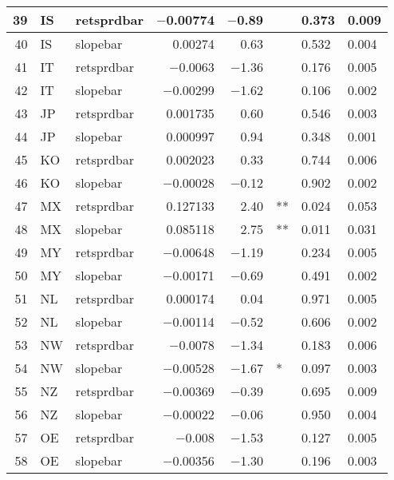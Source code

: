 \begin{longtable}{|r|l|l|r|r|l|l|l|}
   39 &    IS &    retsprdbar &    $-$0.00774 &    $-$0.89 &      &    0.373 &    0.009\\\hline
   40 &    IS &    slopebar &    0.00274 &    0.63 &      &    0.532 &    0.004\\\hline
   41 &    IT &    retsprdbar &    $-$0.0063 &    $-$1.36 &      &    0.176 &    0.005\\\hline
   42 &    IT &    slopebar &    $-$0.00299 &    $-$1.62 &      &    0.106 &    0.002\\\hline
   43 &    JP &    retsprdbar &    0.001735 &    0.60 &      &    0.546 &    0.003\\\hline
   44 &    JP &    slopebar &    0.000997 &    0.94 &      &    0.348 &    0.001\\\hline
   45 &    KO &    retsprdbar &    0.002023 &    0.33 &      &    0.744 &    0.006\\\hline
   46 &    KO &    slopebar &    $-$0.00028 &    $-$0.12 &      &    0.902 &    0.002\\\hline
   47 &    MX &    retsprdbar &    0.127133 &    2.40 &    ** &    0.024 &    0.053\\\hline
   48 &    MX &    slopebar &    0.085118 &    2.75 &    ** &    0.011 &    0.031\\\hline
   49 &    MY &    retsprdbar &    $-$0.00648 &    $-$1.19 &      &    0.234 &    0.005\\\hline
   50 &    MY &    slopebar &    $-$0.00171 &    $-$0.69 &      &    0.491 &    0.002\\\hline
   51 &    NL &    retsprdbar &    0.000174 &    0.04 &      &    0.971 &    0.005\\\hline
   52 &    NL &    slopebar &    $-$0.00114 &    $-$0.52 &      &    0.606 &    0.002\\\hline
   53 &    NW &    retsprdbar &    $-$0.0078 &    $-$1.34 &      &    0.183 &    0.006\\\hline
   54 &    NW &    slopebar &    $-$0.00528 &    $-$1.67 &    * &    0.097 &    0.003\\\hline
   55 &    NZ &    retsprdbar &    $-$0.00369 &    $-$0.39 &      &    0.695 &    0.009\\\hline
   56 &    NZ &    slopebar &    $-$0.00022 &    $-$0.06 &      &    0.950 &    0.004\\\hline
   57 &    OE &    retsprdbar &    $-$0.008 &    $-$1.53 &      &    0.127 &    0.005\\\hline
   58 &    OE &    slopebar &    $-$0.00356 &    $-$1.30 &      &    0.196 &    0.003\\\hline

\end{longtable}
